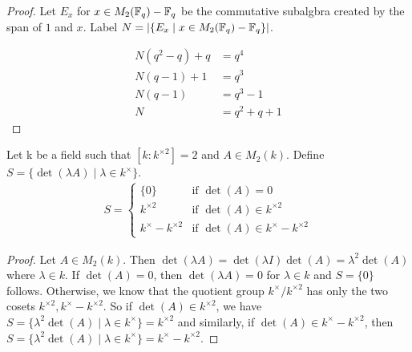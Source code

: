\documentclass{amsart}
\begin{document}
\begin{proof}
    Let $E_x$ for $x \in M_2(\protect\mathbb{F}_q) - \protect\mathbb{F}_q$ be the commutative subalgbra created by the span of $1$ and $x$.
    Label $N = |\{E_x \mid x \in M_2(\protect\mathbb{F}_q) - \protect\mathbb{F}_q \}|$.


    \begin{align*}
        N(q^2 - q) + q &= q^4 \\
        N(q-1) + 1 &= q^3 \\
        N(q-1) &= q^3 - 1 \\
        N &= q^2 + q + 1
    \end{align*}
    
    \end{proof} \begin{lemma} Let k be a field such that $\left[k : k^{\times2}\right] = 2$ and $A \in M_2(k)$. Define $S = \{\det( \lambda A ) \mid \lambda \in k^{\times} \}$.  \begin{align*}
        S =
        \begin{cases}
            \{0\}                     &\text{if } \det(A) = 0 \\
            k^{\times2}              &\text{if } \det(A) \in k^{\times2} \\
            k^{\times} - k^{\times2} &\text{if } \det(A) \in k^{\times} - k^{\times2}
        \end{cases}
    \end{align*}
\end{lemma}
\begin{proof}
    Let $A \in M_2(k)$. Then $\det(\lambda A) = \det(\lambda I)\det(A) = \lambda^2\det(A)$ where $\lambda \in k$.  If $\det(A) = 0$, then $\det(\lambda A) = 0$ for $\lambda \in k$ and $S = \{0\}$ follows. Otherwise, we know that the quotient group $k^{\times}/k^{\times2}$ has only the two cosets $k^{\times2}, k^{\times} - k^{\times2}$. So if $\det(A) \in k^{\times2}$, we have $S = \{\lambda^2 \det(A) \mid \lambda \in k^{\times}\} = k^{\times2}$ and similarly, if $\det(A) \in k^{\times} - k^{\times2}$, then $S = \{\lambda^2 \det(A) \mid \lambda \in k^{\times}\} = k^{\times} - k^{\times2}$.
\end{proof}
\end{document}
